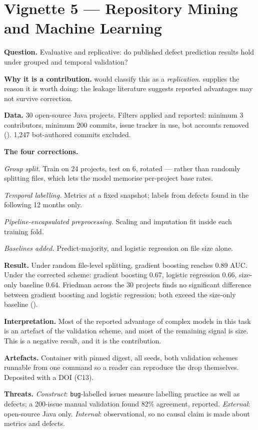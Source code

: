 \section{Vignette 5 --- Repository Mining and Machine Learning}

\begin{vignette}
\textbf{Question.} Evaluative and replicative: do published defect prediction
results hold under grouped and temporal validation?

\medskip
\textbf{Why it is a contribution.}  would classify this as
a \emph{replication}.  supplies the reason it is worth doing: the
leakage literature suggests reported advantages may not survive correction.

\medskip
\textbf{Data.} 30 open-source Java projects. Filters applied and reported:
minimum 3 contributors, minimum 200 commits, issue tracker in use, bot accounts
removed (). 1,247 bot-authored commits excluded.

\medskip
\textbf{The four corrections.}
\begin{tight}
  \item \emph{Group split.} Train on 24 projects, test on 6, rotated --- rather
    than randomly splitting files, which lets the model memorise per-project
    base rates.
  \item \emph{Temporal labelling.} Metrics at a fixed snapshot; labels from
    defects found in the following 12 months only.
  \item \emph{Pipeline-encapsulated preprocessing.} Scaling and imputation fit
    inside each training fold.
  \item \emph{Baselines added.} Predict-majority, and logistic regression on
    file size alone.
\end{tight}

\medskip
\textbf{Result.} Under random file-level splitting, gradient boosting reaches
0.89 AUC. Under the corrected scheme: gradient boosting 0.67, logistic
regression 0.66, size-only baseline 0.64. Friedman across the 30 projects finds
no significant difference between gradient boosting and logistic regression;
both exceed the size-only baseline ().

\medskip
\textbf{Interpretation.} Most of the reported advantage of complex models in
this task is an artefact of the validation scheme, and most of the remaining
signal is size. This is a negative result, and it is the contribution.

\medskip
\textbf{Artefacts.} Container with pinned digest, all seeds, both validation
schemes runnable from one command so a reader can reproduce the drop
themselves. Deposited with a DOI (C13).

\medskip
\textbf{Threats.} \emph{Construct}: \texttt{bug}-labelled issues measure
labelling practice as well as defects; a 200-issue manual validation found 82\%
agreement, reported. \emph{External}: open-source Java only. \emph{Internal}:
observational, so no causal claim is made about metrics and defects.
\end{vignette}

